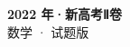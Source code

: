 \documentclass[zihao=-4, a4paper]{ctexart}
\begin{document}
\begin{center}
  {\Large\bfseries 2022 年·新高考Ⅱ卷}\\[4pt]
  {\large 数学 · 试题版}
\end{center}
\medskip
{}

\end{document}
